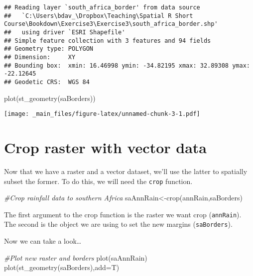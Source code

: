 \documentclass[
]{book}
\newenvironment{Shaded}{\begin{snugshade}}{\end{snugshade}}
\newcommand{\AttributeTok}[1]{\textcolor[rgb]{0.77,0.63,0.00}{#1}}
\newcommand{\CommentTok}[1]{\textcolor[rgb]{0.56,0.35,0.01}{\textit{#1}}}
\newcommand{\FunctionTok}[1]{\textcolor[rgb]{0.00,0.00,0.00}{#1}}
\newcommand{\NormalTok}[1]{#1}
\newcommand{\OtherTok}[1]{\textcolor[rgb]{0.56,0.35,0.01}{#1}}
\begin{document}
\begin{verbatim}
## Reading layer `south_africa_border' from data source 
##   `C:\Users\bdav_\Dropbox\Teaching\Spatial R Short Course\Bookdown\Exercise3\Exercise3\south_africa_border.shp' 
##   using driver `ESRI Shapefile'
## Simple feature collection with 3 features and 94 fields
## Geometry type: POLYGON
## Dimension:     XY
## Bounding box:  xmin: 16.46998 ymin: -34.82195 xmax: 32.89308 ymax: -22.12645
## Geodetic CRS:  WGS 84
\end{verbatim}

\begin{Shaded}
\begin{Highlighting}[]
\FunctionTok{plot}\NormalTok{(}\FunctionTok{st\_geometry}\NormalTok{(saBorders))}
\end{Highlighting}
\end{Shaded}

\texttt{[image: \_main\_files/figure-latex/unnamed-chunk-3-1.pdf]}

\hypertarget{crop-raster-with-vector-data}{%
\section{Crop raster with vector data}\label{crop-raster-with-vector-data}}

Now that we have a raster and a vector dataset, we'll use the latter to spatially subset the former. To do this, we will need the \texttt{crop} function.

\begin{Shaded}
\begin{Highlighting}[]
\CommentTok{\#Crop rainfall data to southern Africa}
\NormalTok{saAnnRain}\OtherTok{\textless{}{-}}\FunctionTok{crop}\NormalTok{(annRain,saBorders)}
\end{Highlighting}
\end{Shaded}

The first argument to the crop function is the raster we want crop (\texttt{annRain}). The second is the object we are using to set the new margins (\texttt{saBorders}).

Now we can take a look\ldots{}

\begin{Shaded}
\begin{Highlighting}[]
\CommentTok{\#Plot new raster and borders}
\FunctionTok{plot}\NormalTok{(saAnnRain)}
\FunctionTok{plot}\NormalTok{(}\FunctionTok{st\_geometry}\NormalTok{(saBorders),}\AttributeTok{add=}\NormalTok{T)}
\end{Highlighting}
\end{Shaded}
\end{document}
